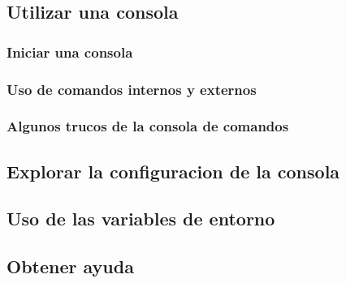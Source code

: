 \subsection*{Utilizar una consola}



\subsubsection*{Iniciar una consola}
			 	

\subsubsection*{Uso de comandos internos y externos}
			 	

\subsubsection*{Algunos trucos de la consola de comandos}


		



\subsection*{Explorar la configuracion de la consola}
			


\subsection*{Uso de las variables de entorno}
			

\subsection*{Obtener ayuda}



